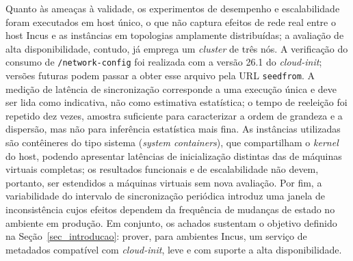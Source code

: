 Quanto às ameaças à validade, os experimentos de desempenho e escalabilidade foram executados em host único, o que não captura efeitos de rede real entre o host Incus e as instâncias em topologias amplamente distribuídas; a avaliação de alta disponibilidade, contudo, já emprega um \textit{cluster} de três nós. A verificação do consumo de \texttt{/network-config} foi realizada com a versão 26.1 do \textit{cloud-init}; versões futuras podem passar a obter esse arquivo pela URL \texttt{seedfrom}. A medição de latência de sincronização corresponde a uma execução única e deve ser lida como indicativa, não como estimativa estatística; o tempo de reeleição foi repetido dez vezes, amostra suficiente para caracterizar a ordem de grandeza e a dispersão, mas não para inferência estatística mais fina. As instâncias utilizadas são contêineres do tipo sistema (\textit{system containers}), que compartilham o \textit{kernel} do host, podendo apresentar latências de inicialização distintas das de máquinas virtuais completas; os resultados funcionais e de escalabilidade não devem, portanto, ser estendidos a máquinas virtuais sem nova avaliação. Por fim, a variabilidade do intervalo de sincronização periódica introduz uma janela de inconsistência cujos efeitos dependem da frequência de mudanças de estado no ambiente em produção. Em conjunto, os achados sustentam o objetivo definido na Seção~\ref{sec_introducao}: prover, para ambientes Incus, um serviço de metadados compatível com \textit{cloud-init}, leve e com suporte a alta disponibilidade.
